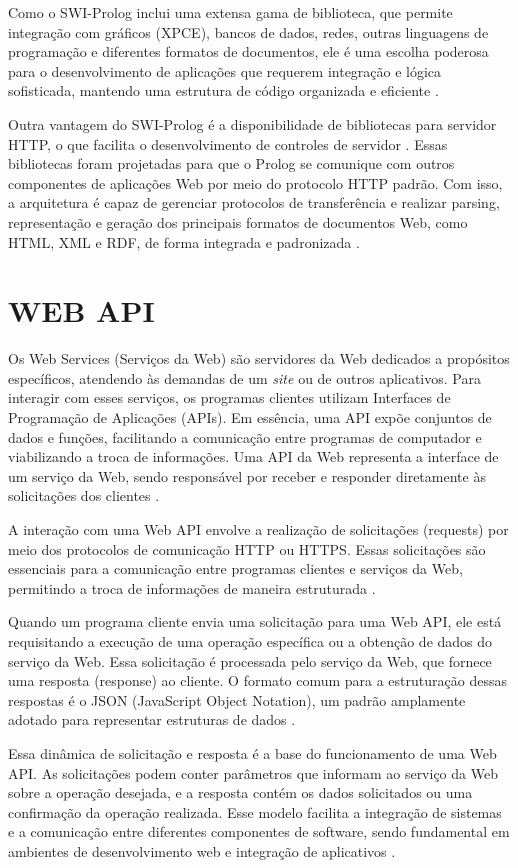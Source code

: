 Como o SWI-Prolog inclui uma extensa gama de biblioteca, que permite integração com gráficos (XPCE), bancos de dados, redes, outras linguagens de programação e diferentes formatos de documentos, ele é uma escolha poderosa para o desenvolvimento de aplicações que requerem integração e lógica sofisticada, mantendo uma estrutura de código organizada e eficiente \cite[p.~1]{wielemakerswiprologversion7}.

Outra vantagem do SWI-Prolog é a disponibilidade de bibliotecas para servidor HTTP, o que facilita o desenvolvimento de controles de servidor \cite{wielemakerswish}. Essas bibliotecas foram projetadas para que o Prolog se comunique com outros componentes de aplicações Web por meio do protocolo HTTP padrão. Com isso, a arquitetura é capaz de gerenciar protocolos de transferência e realizar parsing, representação e geração dos principais formatos de documentos Web, como HTML, XML e RDF, de forma integrada e padronizada \cite{wielemaker}.

\section{WEB API}

Os Web Services (Serviços da Web) são servidores da Web dedicados a propósitos específicos, atendendo às demandas de um \textit{site} ou de outros aplicativos. Para interagir com esses serviços, os programas clientes utilizam Interfaces de Programação de Aplicações (APIs). Em essência, uma API expõe conjuntos de dados e funções, facilitando a comunicação entre programas de computador e viabilizando a troca de informações. Uma API da Web representa a interface de um serviço da Web, sendo responsável por receber e responder diretamente às solicitações dos clientes \cite[p.~5]{masse}.

A interação com uma Web API envolve a realização de solicitações (requests) por meio dos protocolos de comunicação HTTP ou HTTPS. Essas solicitações são essenciais para a comunicação entre programas clientes e serviços da Web, permitindo a troca de informações de maneira estruturada \cite[p.~18-20]{richardson}. 

Quando um programa cliente envia uma solicitação para uma Web API, ele está requisitando a execução de uma operação específica ou a obtenção de dados do serviço da Web. Essa solicitação é processada pelo serviço da Web, que fornece uma resposta (response) ao cliente. O formato comum para a estruturação dessas respostas é o JSON (JavaScript Object Notation), um padrão amplamente adotado para representar estruturas de dados \cite[p.~19-21]{richardson}. 

Essa dinâmica de solicitação e resposta é a base do funcionamento de uma Web API. As solicitações podem conter parâmetros que informam ao serviço da Web sobre a operação desejada, e a resposta contém os dados solicitados ou uma confirmação da operação realizada. Esse modelo facilita a integração de sistemas e a comunicação entre diferentes componentes de software, sendo fundamental em ambientes de desenvolvimento web e integração de aplicativos \cite[p.~20-23]{richardson}.
